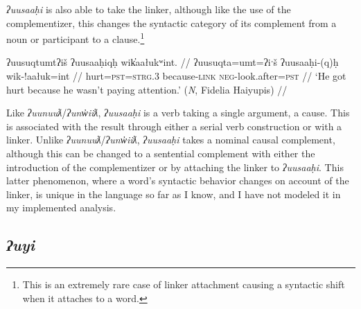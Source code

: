 \textit{ʔuusaaḥi} is also able to take the linker, although like the use of the complementizer, this changes the syntactic category of its complement from a noun or participant to a clause.\footnote{This is an extremely rare case of linker attachment causing a syntactic shift when it attaches to a word.}

\ex \label{ex:uusahiqh}
\begingl
\glpreamble ʔuusuqtumtʔiš ʔuusaaḥiqḥ wik̓aałukʷint. //
\gla ʔuusuqta=umt=ʔiˑš ʔuusaaḥi-(q)ḥ wik-!aałuk=int //
\glb hurt=\textsc{pst}=\textsc{strg.3} because-\textsc{link} \textsc{neg}-look.after=\textsc{pst}  //
\glft `He got hurt because he wasn't paying attention.' (\textit{N}, Fidelia Haiyupis) //
\endgl
\xe



Like \textit{ʔuunuuƛ}/\textit{ʔunw̓iiƛ}, \textit{ʔuusaaḥi} is a verb taking a single argument, a cause. This is associated with the result through either a serial verb construction or with a linker. Unlike \textit{ʔuunuuƛ}/\textit{ʔunw̓iiƛ}, \textit{ʔuusaaḥi} takes a nominal causal complement, although this can be changed to a sentential complement with either the introduction of the complementizer or by attaching the linker to \textit{ʔuusaaḥi}. This latter phenomenon, where a word's syntactic behavior changes on account of the linker, is unique in the language so far as I know, and I have not modeled it in my implemented analysis.

\subsection{\textit{ʔuyi}} \label{ch:link:uyi}

